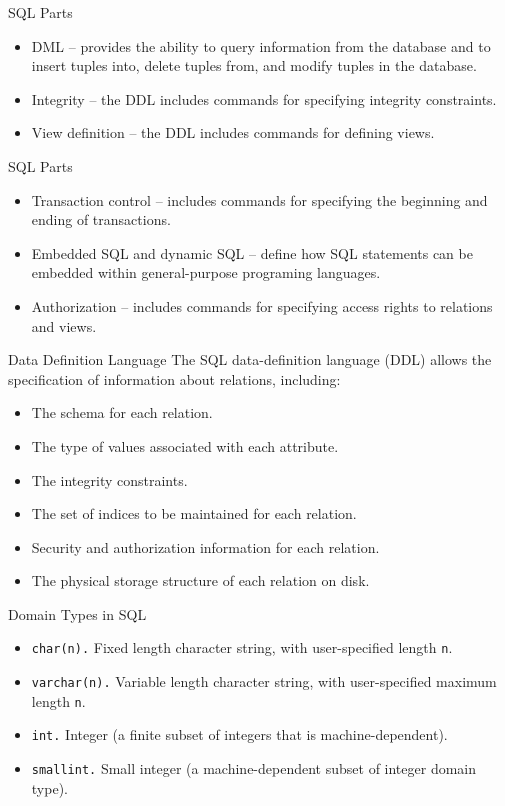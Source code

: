 \documentclass{beamer}
\begin{document}
\begin{frame}{SQL Parts}
    \begin{itemize}
        \item DML -- provides the ability to query information from the database and to insert tuples into, delete tuples from, and modify tuples in the database.
        \item Integrity -- the DDL includes commands for specifying integrity constraints.
        \item View definition -- the DDL includes commands for defining views.
    \end{itemize}
\end{frame}

\begin{frame}{SQL Parts}
    \begin{itemize}
        \item Transaction control -- includes commands for specifying the beginning and ending of transactions.
        \item Embedded SQL and dynamic SQL -- define how SQL statements can be embedded within general-purpose programing languages.
        \item Authorization -- includes commands for specifying access rights to relations and views.
    \end{itemize}
\end{frame}

\begin{frame}{Data Definition Language}
    The SQL data-definition language (DDL) allows the specification of information about relations, including:
    \begin{itemize}
        \item The schema for each relation.
        \item The type of values associated with each attribute.
        \item The integrity constraints.
        \item The set of indices to be maintained for each relation.
        \item Security and authorization information for each relation.
        \item The physical storage structure of each relation on disk.
    \end{itemize}
\end{frame}

\begin{frame}{Domain Types in SQL}
    \begin{itemize}
        \item \texttt{char(n).} Fixed length character string, with user-specified length \texttt{n}.
        \item \texttt{varchar(n).} Variable length character string, with user-specified maximum length \texttt{n}.
        \item \texttt{int.} Integer (a finite subset of integers that is machine-dependent).
        \item \texttt{smallint.} Small integer (a machine-dependent subset of integer domain type).
    \end{itemize}
\end{frame}
\end{document}
